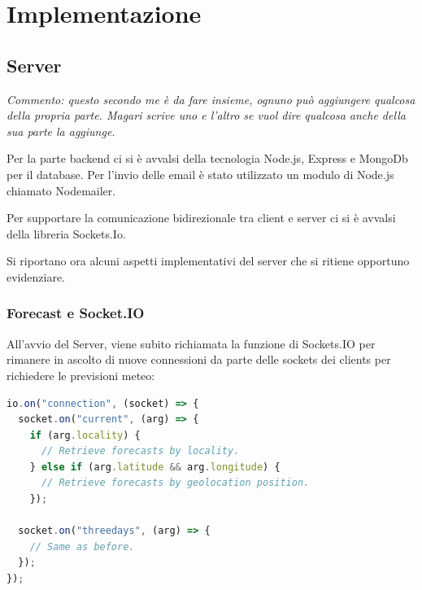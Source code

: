

\chapter{Implementazione}
\section{Server}
\textit{Commento: questo secondo me è da fare insieme, ognuno può aggiungere qualcosa della propria parte. Magari scrive uno e l'altro se vuol dire qualcosa anche della sua parte la aggiunge.}

Per la parte backend ci si è avvalsi della tecnologia Node.js, Express e MongoDb per il database. Per l'invio delle email è stato utilizzato un modulo di Node.js chiamato Nodemailer.


Per supportare la comunicazione bidirezionale tra client e server ci si è avvalsi della libreria Sockets.Io.


Si riportano ora alcuni aspetti implementativi del server che si ritiene opportuno evidenziare. 

\subsection{Forecast e Socket.IO}

All'avvio del Server, viene subito richiamata la funzione di Sockets.IO per rimanere in ascolto di nuove connessioni da parte delle sockets dei clients per richiedere le previsioni meteo:

\begin{lstlisting}[language=Javascript]
io.on("connection", (socket) => {
  socket.on("current", (arg) => {
    if (arg.locality) {
      // Retrieve forecasts by locality.
    } else if (arg.latitude && arg.longitude) {
      // Retrieve forecasts by geolocation position.
    });
    
  socket.on("threedays", (arg) => {
    // Same as before.
  });
});
\end{lstlisting}

